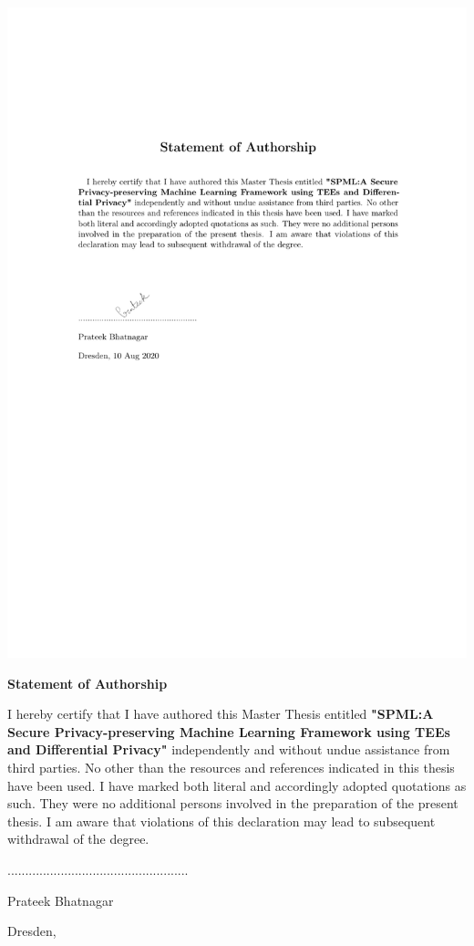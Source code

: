 \section*{}\thispagestyle{empty}
\vspace{2.5cm}
\includegraphics[width=\textwidth]{content/Disclaimer.pdf}

\begin{center}
\textbf{\LARGE Statement of Authorship}
\end{center}
\medskip

I hereby certify that I have authored this Master Thesis
entitled \textbf{"SPML:A Secure Privacy-preserving Machine Learning Framework using TEEs and Differential Privacy"}
independently and without undue assistance from third parties.
No other than the resources and references indicated in this
thesis have been used. I have marked both literal and accordingly
adopted quotations as such. They were no additional persons involved
in the preparation of the present thesis. I am aware that
violations of this declaration may lead to subsequent withdrawal of
the degree.


\vspace{2.5cm}
\noindent ...................................................

\noindent Prateek Bhatnagar

\noindent Dresden, \printdate

\cleardoublepage
